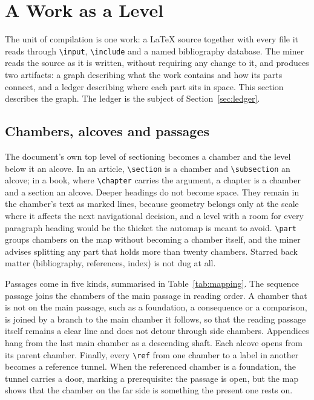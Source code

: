 \documentclass[11pt]{article}
\theoremstyle{remark}
\begin{document}
\section{A Work as a Level}
\label{sec:level}

The unit of compilation is one work: a LaTeX source together with every file it reads through \texttt{\textbackslash input}, \texttt{\textbackslash include} and a named bibliography database. The miner reads the source as it is written, without requiring any change to it, and produces two artifacts: a graph describing what the work contains and how its parts connect, and a ledger describing where each part sits in space. This section describes the graph. The ledger is the subject of Section~\ref{sec:ledger}.

\subsection{Chambers, alcoves and passages}

The document's own top level of sectioning becomes a chamber and the level below it an alcove. In an article, \texttt{\textbackslash section} is a chamber and \texttt{\textbackslash subsection} an alcove; in a book, where \texttt{\textbackslash chapter} carries the argument, a chapter is a chamber and a section an alcove. Deeper headings do not become space. They remain in the chamber's text as marked lines, because geometry belongs only at the scale where it affects the next navigational decision, and a level with a room for every paragraph heading would be the thicket the automap is meant to avoid. \texttt{\textbackslash part} groups chambers on the map without becoming a chamber itself, and the miner advises splitting any part that holds more than twenty chambers. Starred back matter (bibliography, references, index) is not dug at all.

Passages come in five kinds, summarised in Table~\ref{tab:mapping}. The sequence passage joins the chambers of the main passage in reading order. A chamber that is not on the main passage, such as a foundation, a consequence or a comparison, is joined by a branch to the main chamber it follows, so that the reading passage itself remains a clear line and does not detour through side chambers. Appendices hang from the last main chamber as a descending shaft. Each alcove opens from its parent chamber. Finally, every \texttt{\textbackslash ref} from one chamber to a label in another becomes a reference tunnel. When the referenced chamber is a foundation, the tunnel carries a door, marking a prerequisite: the passage is open, but the map shows that the chamber on the far side is something the present one rests on.
\end{document}
